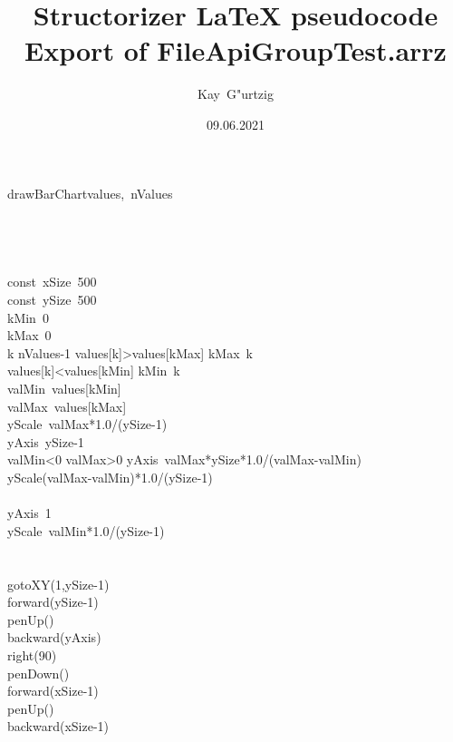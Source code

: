 \documentclass[a4paper,10pt]{article}
\title{Structorizer LaTeX pseudocode Export of FileApiGroupTest.arrz}
\author{Kay\ G"urtzig}
\date{09.06.2021}
\begin{document}
\begin{pseudocode}{drawBarChart}{values,\ nValues }
\label{drawBarChart}
\\
\\
\\
\\
  \\
  const\ xSize\gets\ 500\\
  const\ ySize\gets\ 500\\
  kMin\gets\ 0\\
  kMax\gets\ 0\\
  \FOR k  \TO nValues-1  \DO
    \IF values[k]>values[kMax] \THEN
      kMax\gets\ k\\
    \ELSE
      \IF values[k]<values[kMin] \THEN
        kMin\gets\ k\\
  valMin\gets\ values[kMin]\\
  valMax\gets\ values[kMax]\\
  yScale\gets\ valMax*1.0/(ySize-1)\\
  yAxis\gets\ ySize-1\\
  \IF valMin<0 \THEN
    \IF valMax>0 \THEN
    \BEGIN
      yAxis\gets\ valMax*ySize*1.0/(valMax-valMin)\\
      yScale\gets(valMax-valMin)*1.0/(ySize-1)\\
    \END\\
    \ELSE
    \BEGIN
      yAxis\gets\ 1\\
      yScale\gets\ valMin*1.0/(ySize-1)\\
    \END\\
  \\
  gotoXY(1,ySize-1)\\
  forward(ySize-1)\\
  penUp()\\
  backward(yAxis)\\
  right(90)\\
  penDown()\\
  forward(xSize-1)\\
  penUp()\\
  backward(xSize-1)\\

\end{pseudocode}
\end{document}
